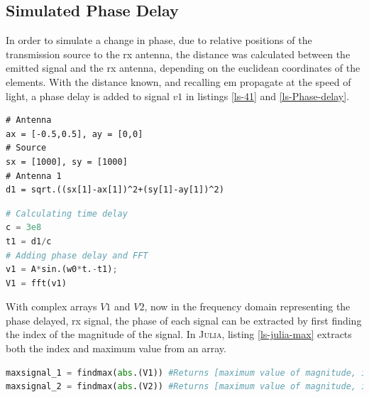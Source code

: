 \documentclass[class=report,11pt,crop=false]{standalone}
\begin{document}
\subsection{Simulated Phase Delay}
In order to simulate a change in phase, due to relative positions of the transmission source to the \gls{rx} antenna, the distance was calculated between the emitted signal and the \gls{rx} antenna, depending on the euclidean coordinates of the elements. With the distance known, and recalling \gls{em} propagate at the speed of light, a phase delay is added to signal $v1$ in listings \ref{ls-41} and \ref{ls-Phase-delay}.

\noindent\hspace{0.03\linewidth}\begin{minipage}[t]{.48\linewidth}\centering
\begin{lstlisting}[caption={Distance between emitted signal and antenna element}, label={ls-41}]
# Antenna
ax = [-0.5,0.5], ay = [0,0]
# Source
sx = [1000], sy = [1000]
# Antenna 1
d1 = sqrt.((sx[1]-ax[1])^2+(sy[1]-ay[1])^2)
\end{lstlisting}
\end{minipage}%
\hspace{0.5cm}
\begin{minipage}[t]{.4\linewidth}\centering
\begin{lstlisting}[language=Python, caption=Adding of a phase delay based off distance between source and \gls{rx} antenna, label=ls-Phase-delay]
# Calculating time delay
c = 3e8
t1 = d1/c
# Adding phase delay and FFT
v1 = A*sin.(w0*t.-t1);
V1 = fft(v1)
\end{lstlisting}
\end{minipage}

With complex arrays $V1$ and $V2$, now in the frequency domain representing the phase delayed, \gls{rx} signal, the phase of each signal can be extracted by first finding the index of the magnitude of the signal. 
In \textsc{Julia}, listing \ref{ls-julia-max} extracts both the index and maximum value from an array. 

\begin{lstlisting}[language=Python, caption=Extracting Index of Maxiumum magnitude value from FFT of \gls{rx} signal, label=ls-julia-max]
maxsignal_1 = findmax(abs.(V1)) #Returns [maximum value of magnitude, index which it occurs]
maxsignal_2 = findmax(abs.(V2)) #Returns [maximum value of magnitude, index which it occurs]
\end{lstlisting}
\end{document}
